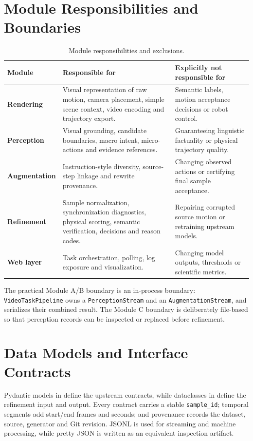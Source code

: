 \documentclass[11pt,oneside]{report}
\begin{document}
\section{Module Responsibilities and Boundaries}
\begin{table}[htbp]
\centering
\caption{Module responsibilities and exclusions.}
\label{tab:module-boundaries}
\begin{tabularx}{\textwidth}{>{\bfseries}p{} X X}
\toprule
Module & Responsible for & Explicitly not responsible for \\
\midrule
Rendering &
Visual representation of raw motion, camera placement, simple scene context,
video encoding and trajectory export. &
Semantic labels, motion acceptance decisions or robot control. \\
Perception &
Visual grounding, candidate boundaries, macro intent, micro-actions and
evidence references. &
Guaranteeing linguistic factuality or physical trajectory quality. \\
Augmentation &
Instruction-style diversity, source-step linkage and rewrite provenance. &
Changing observed actions or certifying final sample acceptance. \\
Refinement &
Sample normalization, synchronization diagnostics, physical scoring, semantic
verification, decisions and reason codes. &
Repairing corrupted source motion or retraining upstream models. \\
Web layer &
Task orchestration, polling, log exposure and visualization. &
Changing model outputs, thresholds or scientific metrics. \\
\bottomrule
\end{tabularx}
\end{table}

The practical Module A/B boundary is an in-process boundary:
\texttt{VideoTaskPipeline} owns a \texttt{PerceptionStream} and an
\texttt{AugmentationStream}, and  serializes their
combined result. The Module C boundary is deliberately file-based so that
perception records can be inspected or replaced before refinement.

\section{Data Models and Interface Contracts}
Pydantic models in  define the upstream
contracts, while dataclasses in  define the
refinement input and output. Every contract carries a stable
\texttt{sample\_id}; temporal segments add start/end frames and seconds; and
provenance records the dataset, source, generator and Git revision. JSONL is
used for streaming and machine processing, while pretty JSON is written as an
equivalent inspection artifact.
\end{document}
